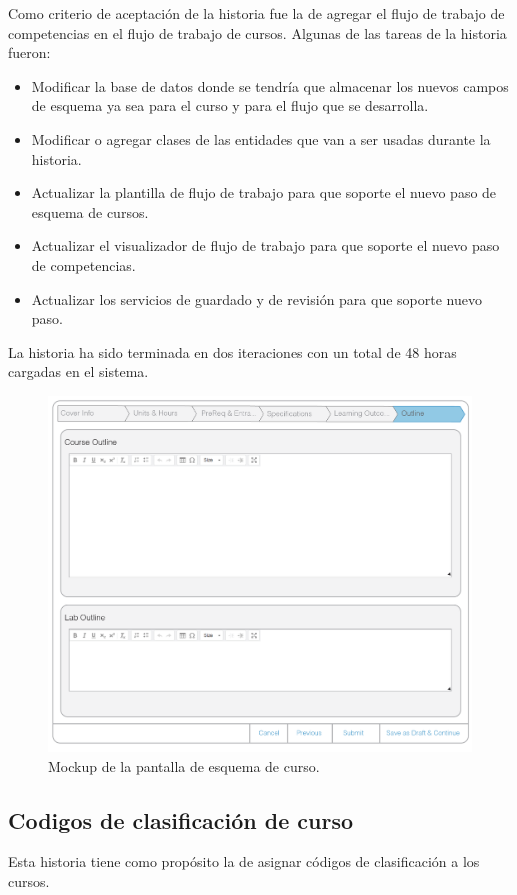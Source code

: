 Como criterio de aceptación de la historia fue la de agregar el flujo de trabajo de competencias en el flujo de trabajo de cursos. Algunas de las tareas de la historia fueron:
\begin{itemize}
	\item Modificar la base de datos donde se tendría que almacenar los nuevos campos de esquema ya sea para el curso y para el flujo que se desarrolla.
	\item Modificar o agregar clases de las entidades que van a ser usadas durante la historia.
	\item Actualizar la plantilla de flujo de trabajo para que soporte el nuevo paso de esquema de cursos.
	\item Actualizar el visualizador de flujo de trabajo para que soporte el nuevo paso de competencias.
	\item Actualizar los servicios de guardado y de revisión para que soporte nuevo paso.
\end{itemize}

La historia ha sido terminada en dos iteraciones con un total de 48 horas cargadas en el sistema.

\begin{figure}[H]
\centering
\includegraphics[scale=0.3]{Capitulos/DesarrollodelaAplicacion/Imagenes/course_outline}
\caption{Mockup de la pantalla de esquema de curso.}
  \label{course_outline}
\end{figure}

\subsection{Codigos de clasificación de curso}
Esta historia tiene como propósito la de asignar códigos de clasificación a los cursos.

